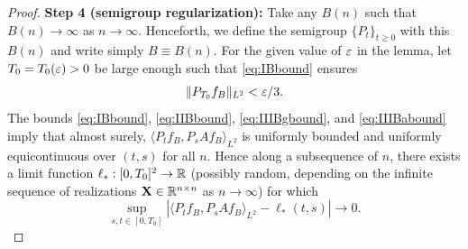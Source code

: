 \begin{proof}
{\bf Step 4 (semigroup regularization):} 
Take any $B(n)$ such that $B(n) \to \infty$ as $n \to \infty$.
Henceforth, we define the semigroup $\{P_t\}_{t \geq 0}$ with this $B(n)$ and
write simply $B \equiv B(n)$. For the given value of
$\varepsilon$ in the lemma, let $T_0=T_0(\varepsilon)>0$ be large enough such that
\eqref{eq:IBbound} ensures
\begin{equation}\label{eq:IBboundT0}
\|P_{T_0}f_B\|_{L^2}<\varepsilon/3.
\end{equation}
The bounds
\eqref{eq:IBbound}, \eqref{eq:IIBbound},
\eqref{eq:IIIBgbound}, and \eqref{eq:IIIBabound} imply
that almost surely, $\langle P_tf_B,P_sAf_B \rangle_{L^2}$
is uniformly bounded and uniformly equicontinuous over $(t,s)$ for all $n$.
Hence along a subsequence of $n$,
there exists a limit function $\ell_*:[0,T_0]^2 \to \mathbb{R}$ 
(possibly random, depending on the infinite sequence of realizations
$\mathbf{X} \in \mathbb{R}^{n \times n}$ as $n \to \infty$) for which
\begin{equation}\label{eq:lstarlimit}
\sup_{s,t \in [0,T_0]} |\langle P_tf_B,P_sAf_B
\rangle_{L^2}-\ell_*(t,s)| \to 0.
\end{equation}


\end{proof}
